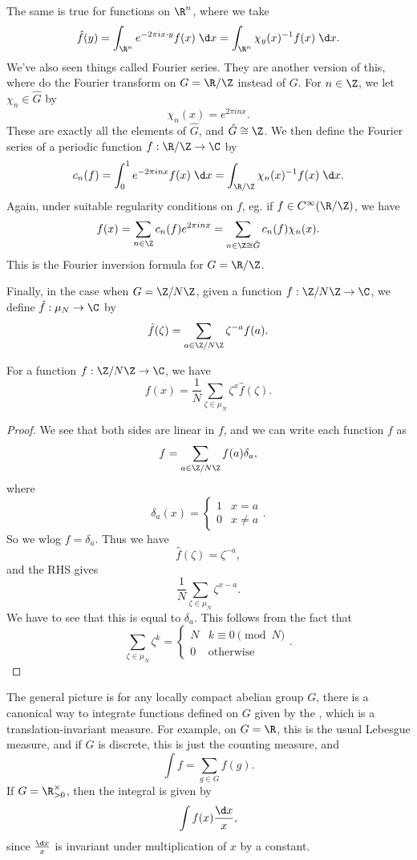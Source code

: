 \documentclass[a4paper]{article}
\begin{document}
The same is true for functions on $\R^n$, where we take
\[
  \hat{f}(y) = \int_{\R^n} e^{-2\pi i x\cdot y} f(x) \;\d x = \int_{\R^n} \chi_y(x)^{-1} f(x)\;\d x.
\]
We've also seen things called Fourier series. They are another version of this, where do the Fourier transform on $G = \R/\Z$ instead of $G$. For $n \in \Z$, we let $\chi_n \in \hat{G}$ by
\[
  \chi_n(x) = e^{2\pi i nx}.
\]
These are exactly all the elements of $\hat{G}$, and $\hat{G} \cong \Z$. We then define the Fourier series of a periodic function $f: \R/\Z \to \C$ by
\[
  c_n(f) = \int_0^1 e^{-2\pi i n x} f(x) \;\d x = \int_{\R/\Z} \chi_n(x)^{-1} f(x) \;\d x.
\]
Again, under suitable regularity conditions on $f$, eg. if $f \in C^\infty(\R/\Z)$, we have
\[
  f(x) = \sum_{n \in \Z} c_n(f) e^{2\pi i nx} = \sum_{n \in \Z \cong \hat{G}} c_n(f) \chi_n(x).
\]
This is the Fourier inversion formula for $G = \R/\Z$.

Finally, in the case when $G = \Z/N\Z$, given a function $f: \Z/N\Z \to \C$, we define $\hat{f}: \mu_N \to \C$ by
\[
  \hat{f}(\zeta) = \sum_{a \in \Z/N\Z} \zeta^{-a} f(a).
\]
\begin{prop}
  For a function $f: \Z/N\Z \to \C$, we have
  \[
    f(x) = \frac{1}{N} \sum_{\zeta \in \mu_N} \zeta^x \hat{f}(\zeta).
  \]
\end{prop}

\begin{proof}
  We see that both sides are linear in $f$, and we can write each function $f$ as
  \[
    f = \sum_{a \in \Z/N\Z} f(a) \delta_a,
  \]
  where
  \[
    \delta_a(x) =
    \begin{cases}
      1 & x = a\\
      0 & x \not= a
    \end{cases}.
  \]
  So we wlog $f = \delta_a$. Thus we have
  \[
    \hat{f}(\zeta) = \zeta^{-a},
  \]
  and the RHS gives
  \[
    \frac{1}{N} \sum_{\zeta \in \mu_N} \zeta^{x - a}.
  \]
  We have to see that this is equal to $\delta_a$. This follows from the fact that
  \[
    \sum_{\zeta \in \mu_N} \zeta^k =
    \begin{cases}
      N & k \equiv 0 \pmod N\\
      0 & \text{otherwise}
    \end{cases}.
  \]
\end{proof}
The general picture is for any locally compact abelian group $G$, there is a canonical way to integrate functions defined on $G$ given by the , which is a translation-invariant measure. For example, on $G = \R$, this is the usual Lebesgue measure, and if $G$ is discrete, this is just the counting measure, and
\[
  \int f = \sum_{g \in G} f(g).
\]
If $G = \R_{> 0}^\times$, then the integral is given by
\[
  \int f(x) \frac{\d x}{x},
\]
since $\frac{\d x}{x}$ is invariant under multiplication of $x$ by a constant.
\end{document}
